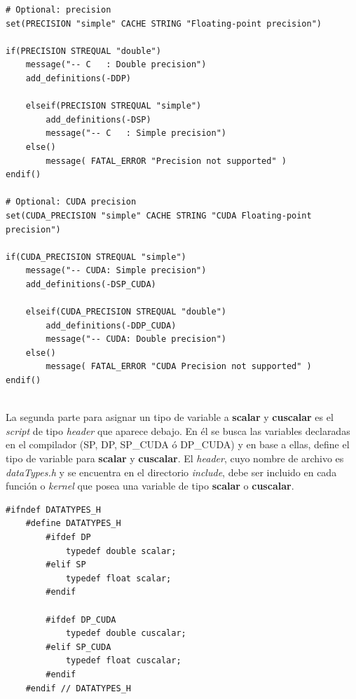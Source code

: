 \newpage
{\scriptsize
	\begin{frame}{}
		\begin{lstlisting}[frame=single]
# Optional: precision
set(PRECISION "simple" CACHE STRING "Floating-point precision")

if(PRECISION STREQUAL "double")
	message("-- C   : Double precision")
	add_definitions(-DDP)

	elseif(PRECISION STREQUAL "simple")
		add_definitions(-DSP)
		message("-- C   : Simple precision")
	else()
		message( FATAL_ERROR "Precision not supported" )
endif()

# Optional: CUDA precision
set(CUDA_PRECISION "simple" CACHE STRING "CUDA Floating-point precision")

if(CUDA_PRECISION STREQUAL "simple")
	message("-- CUDA: Simple precision")
	add_definitions(-DSP_CUDA)

	elseif(CUDA_PRECISION STREQUAL "double")
		add_definitions(-DDP_CUDA)
		message("-- CUDA: Double precision")
	else()
		message( FATAL_ERROR "CUDA Precision not supported" )
endif()
		
		\end{lstlisting}
		
	\end{frame}
}
La segunda parte para asignar un tipo de variable a \textbf{scalar} y \textbf{cuscalar} es el \textit{script} de tipo \textit{header} que aparece debajo. En él se busca las variables declaradas en el compilador (SP, DP, SP\_CUDA ó DP\_CUDA) y en base a ellas, define el tipo de variable para \textbf{scalar} y \textbf{cuscalar}. El \textit{header}, cuyo nombre de archivo es \textit{dataTypes.h} y se encuentra en el directorio \textit{include}, debe ser incluido en cada función o \textit{kernel} que posea una variable de tipo  \textbf{scalar} o \textbf{cuscalar}.

{\footnotesize
	\begin{frame}{}
		\begin{lstlisting}[frame=single]
	#ifndef DATATYPES_H
	#define DATATYPES_H
		#ifdef DP
			typedef double scalar;
		#elif SP
			typedef float scalar;
		#endif	
		
		#ifdef DP_CUDA
			typedef double cuscalar;
		#elif SP_CUDA
			typedef float cuscalar;
		#endif
	#endif // DATATYPES_H
		
		\end{lstlisting}
		
	\end{frame}
}
\newpage

